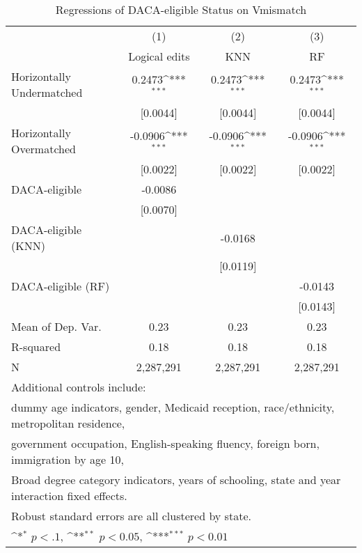 \begin{table}[htbp]\centering
\def\sym#1{\ifmmode^{#1}\else\(^{#1}\)\fi}
\caption{Regressions of DACA-eligible Status on Vmismatch}
\begin{tabular}{l*{3}{c}}
\toprule
                    &\multicolumn{1}{c}{(1)}         &\multicolumn{1}{c}{(2)}         &\multicolumn{1}{c}{(3)}         \\
                    &Logical edits         &         KNN         &          RF         \\
\midrule
Horizontally Undermatched&      0.2473\sym{***}&      0.2473\sym{***}&      0.2473\sym{***}\\
                    &    [0.0044]         &    [0.0044]         &    [0.0044]         \\
\addlinespace
Horizontally Overmatched&     -0.0906\sym{***}&     -0.0906\sym{***}&     -0.0906\sym{***}\\
                    &    [0.0022]         &    [0.0022]         &    [0.0022]         \\
\addlinespace
DACA-eligible       &     -0.0086         &                     &                     \\
                    &    [0.0070]         &                     &                     \\
\addlinespace
DACA-eligible (KNN) &                     &     -0.0168         &                     \\
                    &                     &    [0.0119]         &                     \\
\addlinespace
DACA-eligible (RF)  &                     &                     &     -0.0143         \\
                    &                     &                     &    [0.0143]         \\
\midrule
Mean of Dep. Var.   &        0.23         &        0.23         &        0.23         \\
R-squared           &        0.18         &        0.18         &        0.18         \\
N                   &   2,287,291         &   2,287,291         &   2,287,291         \\
\bottomrule
\multicolumn{4}{l}{\footnotesize Additional controls include:}\\
\multicolumn{4}{l}{\footnotesize dummy age indicators, gender, Medicaid reception, race/ethnicity, metropolitan residence,}\\
\multicolumn{4}{l}{\footnotesize government occupation, English-speaking fluency, foreign born, immigration by age 10,}\\
\multicolumn{4}{l}{\footnotesize Broad degree category indicators, years of schooling, state and year interaction fixed effects.}\\
\multicolumn{4}{l}{\footnotesize Robust standard errors are all clustered by state.}\\
\multicolumn{4}{l}{\footnotesize \sym{*} \(p<.1\), \sym{**} \(p<0.05\), \sym{***} \(p<0.01\)}\\
\end{tabular}
\end{table}

